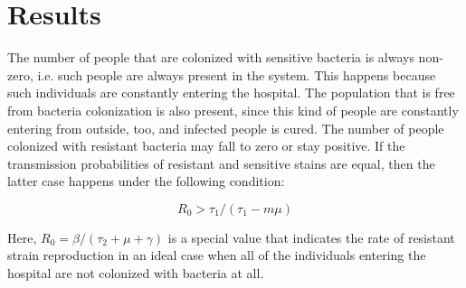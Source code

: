 \chapter*{Results}


The number of people that are colonized with sensitive bacteria is always non-zero, i.e. such people are always present in the system. This happens because such individuals are constantly entering the hospital. The population that is free from bacteria colonization is also present, since this kind of people are constantly entering from outside, too, and infected people is cured. The number of people colonized with resistant bacteria may fall to zero or stay positive. If the transmission probabilities of resistant and sensitive stains are equal, then the latter case happens under the following condition:

\begin{equation}
R_0 > \tau_1/(\tau_1 - m \mu)
\end{equation}

Here, $R_0 = \beta/(\tau_2 + \mu + \gamma)$ is a special value that indicates the rate of resistant strain reproduction in an ideal case when all of the individuals entering the hospital are not colonized with bacteria at all.